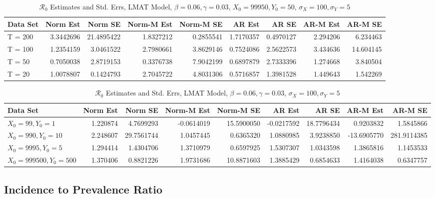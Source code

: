 \documentclass[12pt]{article}
\newcommand{\rr}{\ensuremath{\mathcal{R}_0}}
\begin{document}
\begin{table}[H]
	
	\caption{\label{tab:}$\rr$ Estimates and Std. Errs, LMAT Model,
		$\beta = 0.06, \gamma = 0.03$, $X_0 = 99950, Y_0 = 50$, $\sigma_X = 100, \sigma_Y = 5$}
	\centering
	\begin{tabular}[t]{l|r|r|r|r|r|r|r|r}
		\hline
		Data Set & Norm Est & Norm SE & Norm-M Est & Norm-M SE & AR Est & AR SE & AR-M Est & AR-M SE\\
		\hline
		T = 200 & 3.3442696 & 21.4895422 & 1.8327212 & 0.2855541 & 1.7170357 & 0.4970127 & 2.294206 & 6.234463\\
		\hline
		T = 100 & 1.2354159 & 3.0461522 & 2.7980661 & 3.8629146 & 0.7524086 & 2.5622573 & 3.434636 & 14.604145\\
		\hline
		T = 50 & 0.7050038 & 2.8719153 & 0.3376738 & 7.9042199 & 0.6897879 & 2.7333396 & 1.274668 & 3.840504\\
		\hline
		T = 20 & 1.0078807 & 0.1424793 & 2.7045722 & 4.8031306 & 0.5716857 & 1.3981528 & 1.449643 & 1.542269\\
		\hline
	\end{tabular}
\end{table}

\begin{table}[H]
	
	\caption{\label{tab:}$\rr$ Estimates and Std. Errs, LMAT Model,
		$\beta = 0.06, \gamma = 0.03$, $\sigma_X = 100, \sigma_Y = 5$}
	\centering
	\begin{tabular}[t]{l|r|r|r|r|r|r|r|r}
		\hline
		Data Set & Norm Est & Norm SE & Norm-M Est & Norm-M SE & AR Est & AR SE & AR-M Est & AR-M SE\\
		\hline
		$X_0 = 99, Y_0 = 1$ & 1.220874 & 4.7699293 & -0.0614019 & 15.5900050 & -0.0217592 & 18.7796434 & 0.9203832 & 1.5845866\\
		\hline
		$X_0 = 990, Y_0 = 10$ & 2.248607 & 29.7561744 & 1.0457445 & 0.6365320 & 1.0880985 & 3.9238850 & -13.6905770 & 281.9114385\\
		\hline
		$X_0 = 9995, Y_0 = 5$ & 1.294414 & 1.4304706 & 1.3710979 & 0.6597925 & 1.5307307 & 1.0343598 & 1.3865816 & 1.1453533\\
		\hline
		$X_0 = 999500, Y_0 = 500$ & 1.370406 & 0.8821226 & 1.9731686 & 10.8871603 & 1.3885429 & 0.6854633 & 1.4164038 & 0.6347757\\
		\hline
	\end{tabular}
\end{table}

\subsection{Incidence to Prevalence Ratio}
\end{document}
